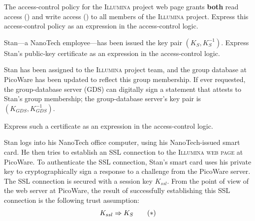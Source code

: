 \begin{exercise}[\synthesis]

  \begin{list}{()}{}
  \item The access-control policy for the \textsc{Illumina} project web
    page grants \textbf{both} read access ()
    and write access () to all members of the
    \textsc{Illumina} project.  Express this access-control policy as an
    expression in the access-control logic.  %

  \item Stan---a \textsf{NanoTech} employee---has been issued the key pair
    $(K_S,K^{-1}_S)$.  Express Stan's public-key 
    certificate as an expression in the access-control logic.

  \item Stan has been assigned to the \textsc{Illumina} project team, and
    the group database at \textsf{PicoWare} has been updated to reflect
    this group membership.  If ever requested, the group-database server
    (GDS) can digitally sign a statement that attests to Stan's group
    membership; the group-database server's key pair is $(K_{GDS},
    K_{GDS}^{-1})$.

    Express such a certificate as an expression in the access-control
    logic.  
    \setcounter{restart}{\thecount}
  \end{list}

  Stan logs into his \textsf{NanoTech} office computer, using his
  \textsf{NanoTech}-issued smart card.  He then tries to establish an
  SSL connection to the \textsc{Illumina web page} at \textsf{PicoWare}.
  To authenticate the SSL connection, Stan's smart card uses his private
  key to cryptographically sign a response to a challenge from the
  \textsf{PicoWare} server.  The SSL connection is secured with a
  session key $K_{ssl}$.  From the point of view of the web server at
  \textsf{PicoWare}, the result of successfully establishing this SSL
  connection is the following trust assumption:
  \[ K_{ssl} \Rightarrow K_{S}  \qquad (\ast) \]


\end{exercise}
